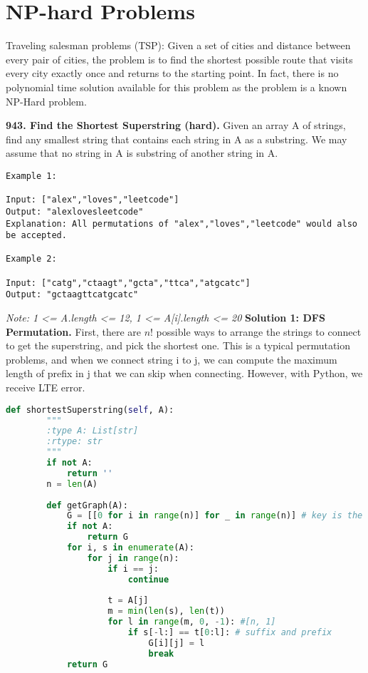 \documentclass[../main.tex]{subfiles}
\begin{document}
\section{NP-hard Problems}
Traveling salesman problems (TSP): Given a set of cities and distance between every pair of cities, the problem is to find the shortest possible route that visits every city exactly once and returns to the starting point. In fact, there is no polynomial time solution available for this problem as the problem is a known NP-Hard problem.
\begin{examples}[resume]
\item \textbf{943. Find the Shortest Superstring (hard).} Given an array A of strings, find any smallest string that contains each string in A as a substring. We may assume that no string in A is substring of another string in A. 
 
\begin{lstlisting}[numbers=none]
Example 1:

Input: ["alex","loves","leetcode"]
Output: "alexlovesleetcode"
Explanation: All permutations of "alex","loves","leetcode" would also be accepted.

Example 2:

Input: ["catg","ctaagt","gcta","ttca","atgcatc"]
Output: "gctaagttcatgcatc"
\end{lstlisting}
\textit{Note: 1 <= A.length <= 12, 1 <= A[i].length <= 20}
\textbf{Solution 1: DFS Permutation.} First, there are $n!$ possible ways to arrange the strings to connect to get the superstring, and pick the shortest one. This is a typical permutation problems, and when we connect string i to j, we can compute the maximum length of prefix in j that we can skip when connecting. However, with Python, we receive LTE error. 
\begin{lstlisting}[language=Python]
    def shortestSuperstring(self, A):
        """
        :type A: List[str]
        :rtype: str
        """
        if not A:
            return ''
        n = len(A)
        
        def getGraph(A):
            G = [[0 for i in range(n)] for _ in range(n)] # key is the index, value (index: length of suffix with the next prefix)
            if not A:
                return G
            for i, s in enumerate(A):
                for j in range(n):
                    if i == j: 
                        continue
                    
                    t = A[j]
                    m = min(len(s), len(t))
                    for l in range(m, 0, -1): #[n, 1]
                        if s[-l:] == t[0:l]: # suffix and prefix
                            G[i][j] = l
                            break
            return G
                 

\end{lstlisting}
\end{examples}
\end{document}
